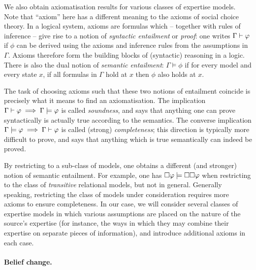 {We also obtain axiomatisation results for various classes of expertise models.
Note that ``axiom'' here has a different meaning to the axioms of social choice
theory. In a logical system, axioms are formulas which -- together with rules
of inference -- give rise to a notion of \emph{syntactic entailment} or
\emph{proof}: one writes $\Gamma \vdash \varphi$ if $\phi$ can be derived using
the axioms and inference rules from the assumptions in $\Gamma$. Axioms
therefore form the building blocks of (syntactic) reasoning in a logic. There is
also the dual notion of \emph{semantic entailment}: $\Gamma \models \phi$ if
for every model and every state $x$, if all formulas in $\Gamma$ hold at $x$
then $\phi$ also holds at $x$.

The task of choosing axioms such that these two notions of entailment coincide
is precisely what it means to find an axiomatisation. The implication $\Gamma
\vdash \varphi \implies \Gamma \models \varphi$ is called \emph{soundness}, and
says that anything one can prove syntactically is actually true according to
the semantics. The converse implication $\Gamma \models \varphi \implies \Gamma
\vdash \varphi$ is called (strong) \emph{completeness};\footnotemark{} this
direction is typically more difficult to prove, and says that anything which is
true semantically can indeed be proved.


By restricting to a sub-class of models, one obtains a different (and stronger)
notion of semantic entailment. For example, one has $\Box\varphi \models
\Box\Box\varphi$ when restricting to the class of \emph{transitive}
relational models, but not in general. Generally speaking, restricting the
class of models under consideration requires more axioms to ensure
completeness. In our case, we will consider several classes of expertise models
in which various assumptions are placed on the nature of the source's expertise
(for instance, the ways in which they may combine their expertise on separate
pieces of information), and introduce additional axioms in each case.

}

\paragraph{Belief change.}

